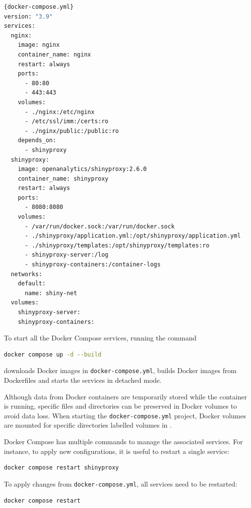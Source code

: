 \begin{lstlisting}[caption=Shortened version of the \texttt{docker-compose.yml} file used for the project. This version only contains the configuration for Nginx and ShinyProxy.,language=bash,label={lst:docker-compose.yml}]{docker-compose.yml}
version: "3.9"
services:
  nginx:
    image: nginx
    container_name: nginx
    restart: always
    ports:
      - 80:80
      - 443:443
    volumes:
      - ./nginx:/etc/nginx
      - /etc/ssl/imm:/certs:ro
      - ./nginx/public:/public:ro
    depends_on:
      - shinyproxy
  shinyproxy:
    image: openanalytics/shinyproxy:2.6.0
    container_name: shinyproxy
    restart: always
    ports:
      - 8080:8080
    volumes:
      - /var/run/docker.sock:/var/run/docker.sock
      - ./shinyproxy/application.yml:/opt/shinyproxy/application.yml
      - ./shinyproxy/templates:/opt/shinyproxy/templates:ro
      - shinyproxy-server:/log
      - shinyproxy-containers:/container-logs
  networks:
    default:
      name: shiny-net
  volumes:
    shinyproxy-server:
    shinyproxy-containers:
\end{lstlisting}

To start all the Docker Compose services, running the command
\begin{lstlisting}[language=bash,numbers=none]
docker compose up -d --build
\end{lstlisting}
downloads Docker images in \texttt{docker-compose.yml}, builds Docker images from Dockerfiles and starts the services in detached mode.

Although data from Docker containers are temporarily stored while the container is running, specific files and directories can be preserved in Docker volumes to avoid data loss. When starting the \texttt{docker-compose.yml} project, Docker volumes are mounted for specific directories labelled volumes in .

Docker Compose has multiple commands to manage the associated services. For instance, to apply new configurations, it is useful to restart a single service:
\begin{lstlisting}[language=bash,numbers=none]
docker compose restart shinyproxy
\end{lstlisting}

To apply changes from \texttt{docker-compose.yml}, all services need to be restarted:
\begin{lstlisting}[language=bash,numbers=none]
docker compose restart
\end{lstlisting}


